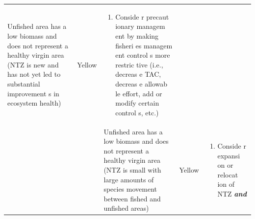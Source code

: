 \documentclass[]{book}
\providecommand{\tightlist}{%
  \setlength{\itemsep}{0pt}\setlength{\parskip}{0pt}}
\begin{document}
\begin{longtable}[]{@{}lllll@{}}
\begin{minipage}[t]{0.19\columnwidth}
Unfished area has a low biomass and does not represent a healthy virgin
area (NTZ is new and has not yet led to substantial improvement s in
ecosystem health)\strut
\end{minipage} & \begin{minipage}[t]{0.19\columnwidth}\raggedright\strut
Yellow\strut
\end{minipage} & \begin{minipage}[t]{0.19\columnwidth}\raggedright\strut
\begin{enumerate}
\def\labelenumi{\arabic{enumi}.}
\tightlist
\item
  Conside r precaut ionary managem ent by making fisheri es managem ent
  control s more restric tive (i.e., decreas e TAC, decreas e allowab le
  effort, add or modify certain control s, etc.)
\end{enumerate}\strut
\end{minipage}\tabularnewline
\begin{minipage}[t]{0.19\columnwidth}\raggedright\strut
\strut
\end{minipage} & \begin{minipage}[t]{0.19\columnwidth}\raggedright\strut
\strut
\end{minipage} & \begin{minipage}[t]{0.19\columnwidth}\raggedright\strut
Unfished area has a low biomass and does not represent a healthy virgin
area (NTZ is small with large amounts of species movement between fished
and unfished areas)\strut
\end{minipage} & \begin{minipage}[t]{0.19\columnwidth}\raggedright\strut
Yellow\strut
\end{minipage} & \begin{minipage}[t]{0.19\columnwidth}\raggedright\strut
\begin{enumerate}
\def\labelenumi{\arabic{enumi}.}
\tightlist
\item
  Conside r expansi on or relocat ion of NTZ \textbf{\emph{and} }
\end{enumerate}


\end{minipage}
\end{longtable}
\end{document}
